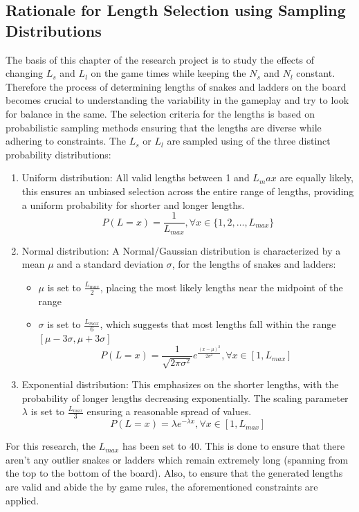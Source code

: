 \documentclass[12pt]{report}
\begin{document}
	\subsection{Rationale for Length Selection using Sampling Distributions}
	The basis of this chapter of the research project is to study the effects of changing $L_s$ and $L_l$ on the game times while keeping the $N_s$ and $N_l$ constant. Therefore the process of determining lengths of snakes and ladders on the board becomes crucial to understanding the variability in the gameplay and try to look for balance in the same. The selection criteria for the lengths is based on probabilistic sampling methods ensuring that the lengths are diverse while adhering to constraints. The $L_s$ or $L_l$ are sampled using of the three distinct probability distributions:
	\begin{enumerate}
		\item Uniform distribution: All valid lengths between 1 and $L_max$ are equally likely, this ensures an unbiased selection across the entire range of lengths, providing a uniform probability for shorter and longer lengths.
		$$P(L=x)=\frac{1}{L_{max}}, \forall x \in \{1,2,\ldots,L_{max}\}$$
		\item Normal distribution: A Normal/Gaussian distribution is characterized by a mean $\mu$ and a standard deviation $\sigma$, for the lengths of snakes and ladders:
		\begin{itemize}
			\item $\mu$ is set to $\frac{L_{max}}{2}$, placing the most likely lengths near the midpoint of the range
			\item $\sigma$ is set to $\frac{L_{max}}{6}$, which suggests that most lengths fall within the range $[\mu-3\sigma, \mu+3\sigma]$
			$$P(L=x) = \frac{1}{\sqrt{2\pi\sigma^2}}{e^{\frac{(x-\mu)^2}{2\sigma^2}}, \forall x\in[1, L_{max}]}$$
		\end{itemize}
		\item Exponential distribution: This emphasizes on the shorter lengths, with the probability of longer lengths decreasing exponentially. The scaling parameter $\lambda$ is set to $\frac{L_{max}}{3}$ ensuring a reasonable spread of values.
		$$P(L=x)={\lambda}e^{{-\lambda}x}, \forall x \in [1, L_{max}]$$
	\end{enumerate}
	
	For this research, the $L_{max}$ has been set to 40. This is done to ensure that there aren't any outlier snakes or ladders which remain extremely long (spanning from the top to the bottom of the board). Also, to ensure that the generated lengths are valid and abide the by game rules, the aforementioned constraints are applied.
	
\end{document}
